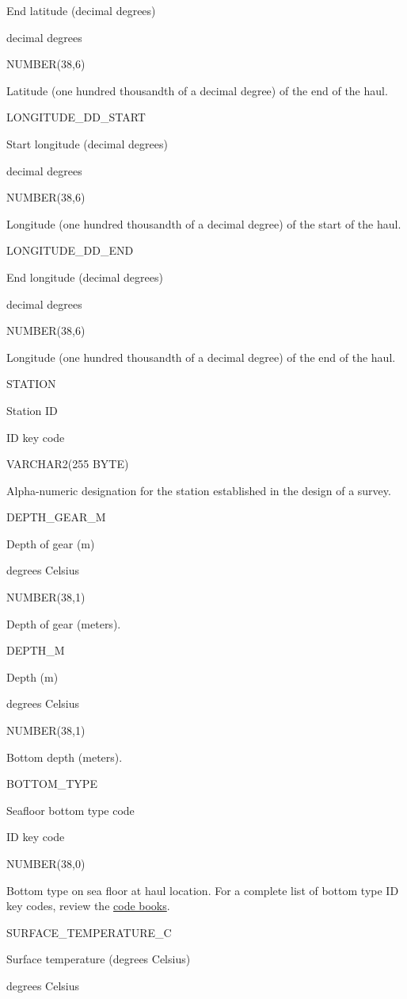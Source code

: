 \documentclass[
  letterpaper,
  oneside,
  open=any]{scrbook}
\begin{document}
End latitude (decimal degrees)

decimal degrees

NUMBER(38,6)

Latitude (one hundred thousandth of a decimal degree) of the end of the
haul.

LONGITUDE\_DD\_START

Start longitude (decimal degrees)

decimal degrees

NUMBER(38,6)

Longitude (one hundred thousandth of a decimal degree) of the start of
the haul.

LONGITUDE\_DD\_END

End longitude (decimal degrees)

decimal degrees

NUMBER(38,6)

Longitude (one hundred thousandth of a decimal degree) of the end of the
haul.

STATION

Station ID

ID key code

VARCHAR2(255 BYTE)

Alpha-numeric designation for the station established in the design of a
survey.

DEPTH\_GEAR\_M

Depth of gear (m)

degrees Celsius

NUMBER(38,1)

Depth of gear (meters).

DEPTH\_M

Depth (m)

degrees Celsius

NUMBER(38,1)

Bottom depth (meters).

BOTTOM\_TYPE

Seafloor bottom type code

ID key code

NUMBER(38,0)

Bottom type on sea floor at haul location. For a complete list of bottom
type ID key codes, review the
\href{https://www.fisheries.noaa.gov/resource/document/groundfish-survey-species-code-manual-and-data-codes-manual}{code
books}.

SURFACE\_TEMPERATURE\_C

Surface temperature (degrees Celsius)

degrees Celsius
\end{document}
